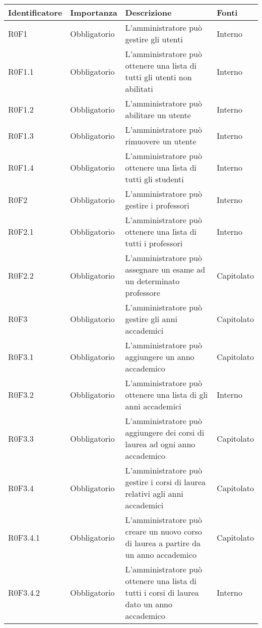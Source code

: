 \documentclass[AnalisiDeiRequisiti.tex]{subfiles}
\begin{document}
\label{table:Tabella requisiti funzionali}
\renewcommand*{\arraystretch}{1.2}
\begin{longtable}[H]{p{2.6cm}p{2.5cm}p{5cm}p{2cm}}
	\rowcolor{CHeader} 
	\color{CHeaderText} \textbf{Identificatore} & \color{CHeaderText} \textbf{Importanza} & \color{CHeaderText} \textbf{Descrizione} & \color{CHeaderText} \textbf{Fonti} \\
	\endhead
	R0F1 & Obbligatorio & L'amministratore può gestire gli utenti & Interno \\
	R0F1.1 & Obbligatorio & L'amministratore può ottenere una lista di tutti gli utenti non abilitati & Interno \\  
	R0F1.2 & Obbligatorio & L'amministratore può abilitare un utente & Interno \\  
	R0F1.3 & Obbligatorio & L'amministratore può rimuovere un utente & Interno \\  
	R0F1.4 & Obbligatorio & L'amministratore può ottenere una lista di tutti gli studenti & Interno \\  
	R0F2 & Obbligatorio & L'amministratore può gestire i professori & Interno \\  
	R0F2.1 & Obbligatorio & L'amministratore può ottenere una lista di tutti i professori & Interno \\  
	R0F2.2 & Obbligatorio & L'amministratore può assegnare un esame ad un determinato professore & Capitolato \\  
	R0F3 & Obbligatorio & L'amministratore può gestire gli anni accademici & Capitolato \\  
	R0F3.1 & Obbligatorio & L'amministratore può aggiungere un anno accademico & Capitolato \\  
	R0F3.2 & Obbligatorio & L'amministratore può ottenere una lista di gli anni accademici & Interno \\  
	R0F3.3 & Obbligatorio & L'amministratore può aggiungere dei corsi di laurea ad ogni anno accademico & Capitolato \\  
	R0F3.4 & Obbligatorio & L'amministratore può gestire i corsi di laurea relativi agli anni accademici & Capitolato \\  
	R0F3.4.1 & Obbligatorio & L'amministratore può creare un nuovo corso di laurea a partire da un anno accademico & Capitolato \\  
	R0F3.4.2 & Obbligatorio & L'amministratore può ottenere una lista di tutti i corsi di laurea dato un anno accademico & Interno \\  

\end{longtable}
\end{document}
